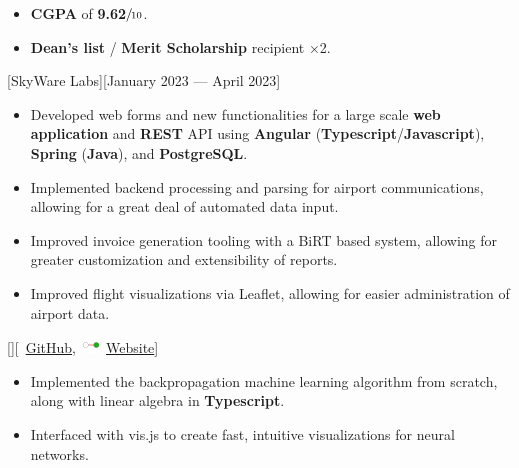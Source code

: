 \documentclass{article}
\begin{document}
\begin{itemize}
	\item \textbf{CGPA} of \textbf{9.62}\(\sfrac{}{10}\).
	\item \textbf{Dean's list} / \textbf{Merit Scholarship} recipient
	      \(\times\)2.
\end{itemize}

\vspace*{\fill}


[SkyWare Labs][January 2023 --- April 2023]

\begin{itemize}
	\item Developed web forms and new functionalities for a large scale
	      \textbf{web application} and \textbf{REST} API using
	      \textbf{Angular} (\textbf{Typescript}/\textbf{Javascript}),
	      \textbf{Spring} (\textbf{Java}), and \textbf{PostgreSQL}.
	\item Implemented backend processing and parsing for airport communications,
	      allowing for a great deal of automated data input.
	\item Improved invoice generation tooling with a BiRT based system, allowing
	      for greater customization and extensibility of reports.
	\item Improved flight visualizations via Leaflet, allowing for easier
	      administration of airport data.
\end{itemize}

\vspace*{\fill}


[][\faGithub\
	\href{https://github.com/kinseyda/neural-playground}{GitHub},\
	\includegraphics[height=1.5ex]{neural-icon-small.png}\
	\href{https://kinseyda.github.io/neural-playground/}{Website}]

\begin{itemize}
	\item Implemented the backpropagation machine learning algorithm from
	      scratch, along with linear algebra in \textbf{Typescript}.
	\item Interfaced with vis.js to create fast, intuitive visualizations for
	      neural networks.
\end{itemize}
\end{document}
